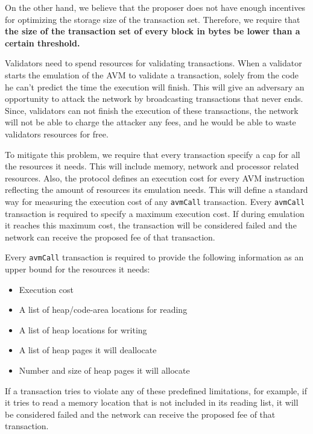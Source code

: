 On the other hand, we believe that the proposer does not have enough incentives for optimizing the storage size
of the transaction set. Therefore, we require that \textbf{the size of the transaction set of every block in
bytes be lower than a certain threshold.}

Validators need to spend resources for validating transactions. When a validator starts the emulation of the AVM
to validate a transaction, solely from the code he can't predict the time the execution will finish. This will
give an adversary an opportunity to attack the network by broadcasting transactions that never ends. Since,
validators can not finish the execution of these transactions, the network will not be able to charge the
attacker any fees, and he would be able to waste validators resources for free.

To mitigate this problem, we require that every transaction specify a cap for all the resources it needs. This
will include memory, network and processor related resources. Also, the protocol defines an execution cost for
every AVM instruction reflecting the amount of resources its emulation needs. This will define a standard way for
measuring the execution cost of any \texttt{avmCall} transaction. Every \texttt{avmCall} transaction is required
to specify a maximum execution cost. If during emulation it reaches this maximum cost, the transaction will be
considered failed and the network can receive the proposed fee of that transaction.

Every \texttt{avmCall} transaction is required to provide the following information as an upper bound for the
resources it needs:

\begin{itemize}
    \item Execution cost
    \item A list of heap/code-area locations for reading
    \item A list of heap locations for writing
    \item A list of heap pages it will deallocate
    \item Number and size of heap pages it will allocate
\end{itemize}

If a transaction tries to violate any of these predefined limitations, for example, if it tries to read a memory
location that is not included in its reading list, it will be considered failed and the network can receive the
proposed fee of that transaction.

